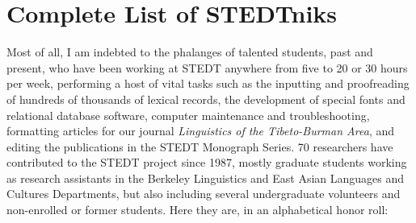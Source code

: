 \section{Complete List of STEDTniks}

Most of all, I am indebted to the phalanges of talented students, past and present, who have been working at STEDT anywhere from five to 20 or 30 hours per week, performing a host of vital tasks such as the inputting and proofreading of hundreds of thousands of lexical records, the development of special fonts and relational database software, computer maintenance and troubleshooting, formatting articles for our journal {\it Linguistics of the Tibeto-Burman Area}, and editing the publications in the STEDT Monograph Series. 70 researchers have contributed to the STEDT project since 1987, mostly graduate students working as research assistants in the Berkeley Linguistics and East Asian Languages and Cultures Departments, but also including several undergraduate volunteers and non-enrolled or former students. Here they are, in an alphabetical honor roll:

